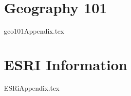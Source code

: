 \documentclass[class=report , crop=false, openany, titlepage, twoside, multi={itemize, figure, verbatim}, float=false]{standalone}
\title{}  %
\begin{document}
\ifstandalone
\maketitle %
\clearpage
\tableofcontents %
\fi


\begin{appendices}
\chapter{Geography 101}

{geo101Appendix.tex}

\chapter{ESRI Information}

{ESRiAppendix.tex}

\end{appendices}
\end{document}

